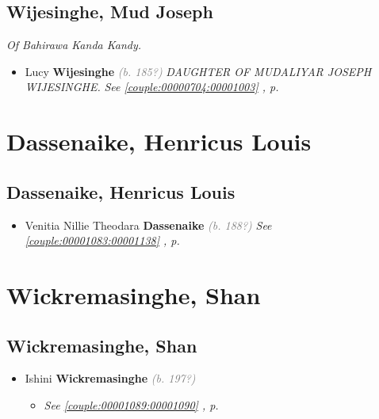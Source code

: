 \documentclass[10pt, openany]{book}
\begin{document}
\chapter{Wijesinghe, Mud Joseph}
\label{00001005}
\textcolor{slmaroon}{\textit{Of Bahirawa Kanda Kandy.}}
\begin{itemize}
\item{Lucy \textbf{Wijesinghe} \textcolor{gray}{\textit{(b. 185?)}} \textcolor{slmaroon}{\textit{DAUGHTER OF MUDALIYAR JOSEPH WIJESINGHE.}} \textcolor{slteal}{\textit{See  \autoref{couple:00000704:00001003} \textit{, p. \pageref{couple:00000704:00001003} }}}}
\end{itemize}
  
\part{Dassenaike, Henricus Louis}
\chapter{Dassenaike, Henricus Louis}
\label{00001084}
\textcolor{slmaroon}{\textit{}}
\begin{itemize}
\item{Venitia Nillie Theodara \textbf{Dassenaike} \textcolor{gray}{\textit{(b. 188?)}} \textcolor{slteal}{\textit{See  \autoref{couple:00001083:00001138} \textit{, p. \pageref{couple:00001083:00001138} }}}}
\end{itemize}
  
\part{Wickremasinghe, Shan}
\chapter{Wickremasinghe, Shan}
\label{00001091}
\textcolor{slmaroon}{\textit{}}
\begin{itemize}
\item{Ishini \textbf{Wickremasinghe} \textcolor{gray}{\textit{(b. 197?)}}
\begin{itemize}
\item{\textcolor{slteal}{\textit{See  \autoref{couple:00001089:00001090} \textit{, p. \pageref{couple:00001089:00001090} }}}}
\end{itemize}
 }
\end{itemize}
 
\end{document}

